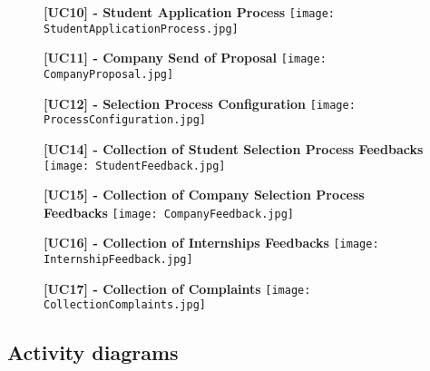 			
			\begin{figure}[H]
				\centering
				{\bfseries [UC10] - Student Application Process}
				\texttt{[image: StudentApplicationProcess.jpg]}
				
			\end{figure}
			
			\begin{figure}[H]
				\centering
				{\bfseries [UC11] - Company Send of Proposal}
				\texttt{[image: CompanyProposal.jpg]}
				
			\end{figure}
			
			\begin{figure}[H]
				\centering
				{\bfseries [UC12] - Selection Process Configuration}
				\texttt{[image: ProcessConfiguration.jpg]}
				
			\end{figure}
			
			\begin{figure}[H]
				\centering
				{\bfseries [UC14] - Collection of Student Selection Process Feedbacks}
				\texttt{[image: StudentFeedback.jpg]}
				
			\end{figure}
			
			\begin{figure}[H]
				\centering
				{\bfseries [UC15] - Collection of Company Selection Process Feedbacks}
				\texttt{[image: CompanyFeedback.jpg]}
				
			\end{figure}
			
			\begin{figure}[H]
				\centering
				{\bfseries [UC16] - Collection of Internships Feedbacks}
				\texttt{[image: InternshipFeedback.jpg]}
				
			\end{figure}
			
			
			\begin{figure}[H]
				\centering
				{\bfseries [UC17] - Collection of Complaints}
				\texttt{[image: CollectionComplaints.jpg]}
				
			\end{figure}
			
		\subsection{Activity diagrams}
		
